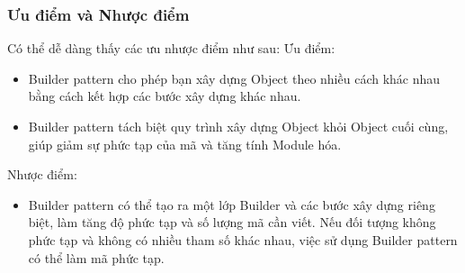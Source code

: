 \subsubsection{Ưu điểm và Nhược điểm }
Có thể dễ dàng thấy các ưu nhược điểm như sau:
Ưu điểm:
\begin{itemize}
    \item Builder pattern cho phép bạn xây dựng Object theo nhiều cách khác nhau bằng cách kết hợp các bước xây dựng khác nhau.
    \item Builder pattern tách biệt quy trình xây dựng Object khỏi Object cuối cùng, giúp giảm sự phức tạp của mã và tăng tính Module hóa.
\end{itemize}
Nhược điểm:
\begin{itemize}
    \item Builder pattern có thể tạo ra một lớp Builder và các bước xây dựng riêng biệt, làm tăng độ phức tạp và số lượng mã cần viết. Nếu đối tượng không phức tạp và không có nhiều tham số khác nhau, việc sử dụng Builder pattern có thể làm mã phức tạp.
\end{itemize}
